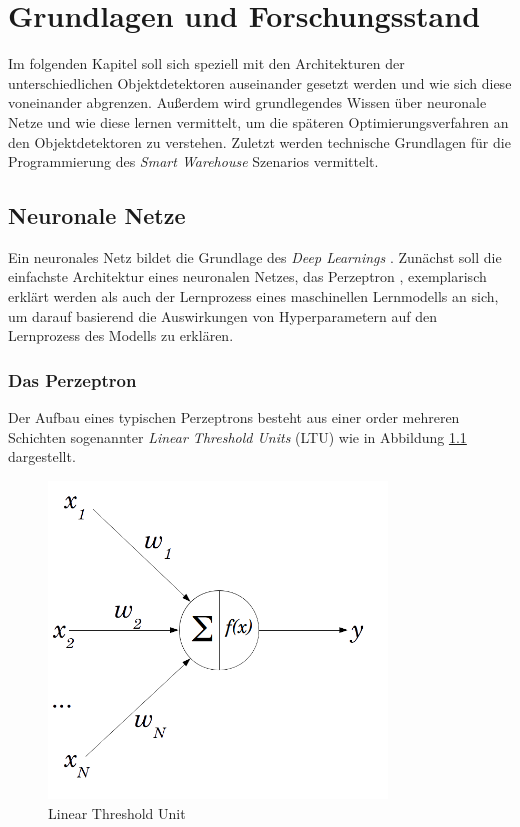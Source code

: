 \chapter{Grundlagen und Forschungsstand}

Im folgenden Kapitel soll sich speziell mit den Architekturen der unterschiedlichen Objektdetektoren auseinander gesetzt werden und wie sich diese voneinander abgrenzen. Außerdem wird grundlegendes Wissen über neuronale Netze und wie diese \glqq lernen\grqq{} vermittelt, um die späteren Optimierungsverfahren an den Objektdetektoren zu verstehen. Zuletzt werden technische Grundlagen für die Programmierung des \textit{Smart Warehouse} Szenarios vermittelt.

\section{Neuronale Netze}

Ein neuronales Netz bildet die Grundlage des \textit{Deep Learnings} \cite[S. 253]{AurelienGeron.2018}. Zunächst soll die einfachste Architektur eines neuronalen Netzes, das Perzeptron \cite[S. 257]{AurelienGeron.2018}, exemplarisch erklärt werden als auch der Lernprozess eines maschinellen Lernmodells an sich, um darauf basierend die Auswirkungen von Hyperparametern auf den Lernprozess des Modells zu erklären. 

\subsection*{Das Perzeptron}

Der Aufbau eines typischen Perzeptrons besteht aus einer order mehreren Schichten sogenannter \textit{Linear Threshold Units} (LTU) wie in Abbildung \ref{ltu} dargestellt.

\begin{figure}[ht]
	\begin{center}
		\includegraphics[width=9cm]{Bilder/perceptron.png} 
		\caption[Linear Threshold Unit]{Linear Threshold Unit \cite{PhilippeLucidarme.2017}}
		\label{ltu}
	\end{center}
\end{figure}

